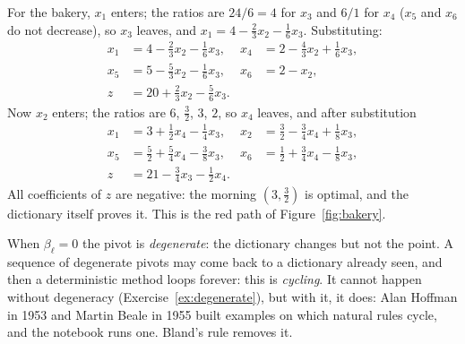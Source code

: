 For the bakery, $x_1$ enters; the ratios are $24/6=4$ for $x_3$ and $6/1$ for $x_4$ ($x_5$ and $x_6$ do not decrease), so $x_3$ leaves, and $x_1=4-\tfrac23x_2-\tfrac16x_3$. Substituting:
\[
\begin{aligned}
x_1&=4-\tfrac23x_2-\tfrac16x_3, & x_4&=2-\tfrac43x_2+\tfrac16x_3,\\
x_5&=5-\tfrac53x_2-\tfrac16x_3, & x_6&=2-x_2,\\
z&=20+\tfrac23x_2-\tfrac56x_3.
\end{aligned}
\]
Now $x_2$ enters; the ratios are $6$, $\tfrac32$, $3$, $2$, so $x_4$ leaves, and after substitution
\[
\begin{aligned}
x_1&=3+\tfrac12x_4-\tfrac14x_3, & x_2&=\tfrac32-\tfrac34x_4+\tfrac18x_3,\\
x_5&=\tfrac52+\tfrac54x_4-\tfrac38x_3, & x_6&=\tfrac12+\tfrac34x_4-\tfrac18x_3,\\
z&=21-\tfrac34x_3-\tfrac12x_4.
\end{aligned}
\]
All coefficients of $z$ are negative: the morning $(3,\tfrac32)$ is optimal, and the dictionary itself proves it. This is the red path of Figure~\ref{fig:bakery}.

When $\beta_\ell=0$ the pivot is \emph{degenerate}: the dictionary changes but not the point. A sequence of degenerate pivots may come back to a dictionary already seen, and then a deterministic method
loops forever: this is \emph{cycling}. It cannot happen without degeneracy (Exercise~\ref{ex:degenerate}), but with it, it does: Alan Hoffman in 1953 and Martin Beale in 1955 built examples on which natural rules cycle, and the notebook runs one. Bland's rule removes it.

